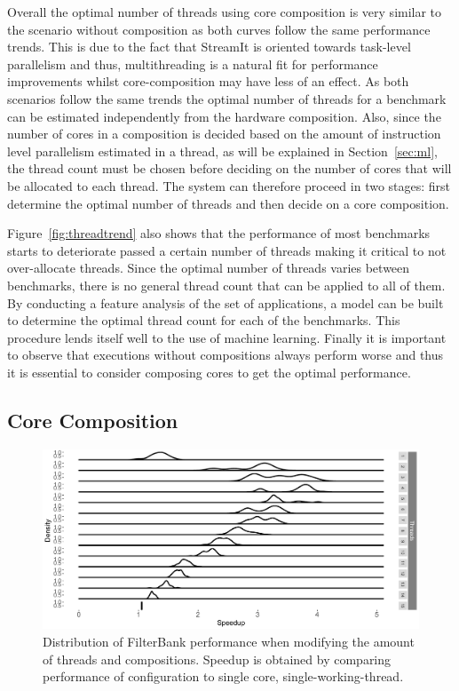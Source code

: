 Overall the optimal number of threads using core composition is very similar to the scenario without composition as both curves follow the same performance trends.
This is due to the fact that StreamIt is oriented towards task-level parallelism and thus, multithreading is a natural fit for performance improvements whilst core-composition may have less of an effect.
As both scenarios follow the same trends the optimal number of threads for a benchmark can be estimated independently from the hardware composition.
Also, since the number of cores in a composition is decided based on the amount of instruction level parallelism estimated in a thread, as will be explained in Section~\ref{sec:ml}, the thread count must be chosen before deciding on the number of cores that will be allocated to each thread.
The system can therefore proceed in two stages: first determine the optimal number of threads and then decide on a core composition.

Figure~\ref{fig:threadtrend} also shows that the performance of most benchmarks starts to deteriorate passed a certain number of threads making it critical to not over-allocate threads.
Since the optimal number of threads varies between benchmarks, there is no general thread count that can be applied to all of them.
By conducting a feature analysis of the set of applications, a model can be built to determine the optimal thread count for each of the benchmarks.
This procedure lends itself well to the use of machine learning.
Finally it is important to observe that executions without compositions always perform worse and thus it is essential to consider composing cores to get the optimal performance.


\subsection{Core Composition}

\begin{figure}[t]
  \includegraphics[width=1\textwidth]{streamit-paper/graphics/filterbank_tot2.pdf}
  \caption{Distribution of FilterBank performance when modifying the amount of threads and compositions. Speedup is obtained by comparing performance of configuration to single core, single-working-thread.}\label{fig:fbtotal}
\end{figure}

